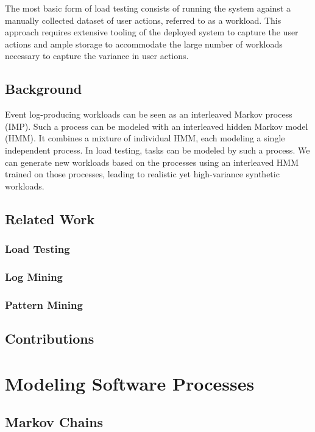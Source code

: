 The most basic form of load testing consists of running the system against a manually collected dataset of user actions, referred to as a workload. This approach requires extensive tooling of the deployed system to capture the user actions and ample storage to accommodate the large number of workloads necessary to capture the variance in user actions.

\subsection{Background}

Event log-producing workloads can be seen as an interleaved Markov process (IMP). Such a process can be modeled with an interleaved hidden Markov model (HMM). It combines a mixture of individual HMM, each modeling a single independent process. In load testing, tasks can be modeled by such a process. We can generate new workloads based on the processes using an interleaved HMM trained on those processes, leading to realistic yet high-variance synthetic workloads.

\subsection{Related Work}

\subsubsection{Load Testing}

\subsubsection{Log Mining}

\subsubsection{Pattern Mining}

\subsection{Contributions}

\section{Modeling Software Processes}

\subsection{Markov Chains}

